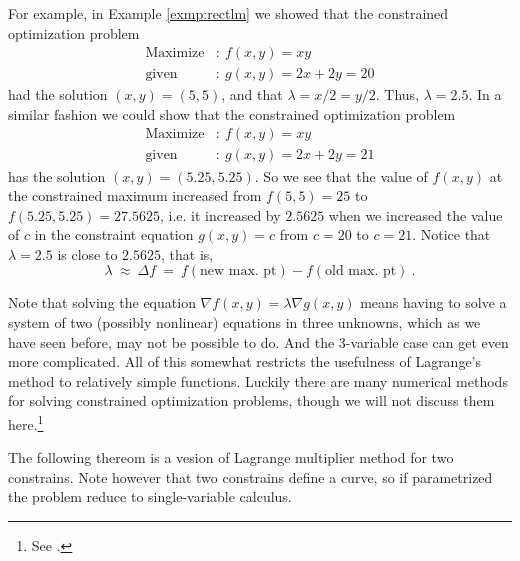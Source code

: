 For example, in Example \ref{exmp:rectlm} we showed that the constrained optimization problem
\begin{align*}
  \text{Maximize}&: ~ f(x,y) = xy\\
  \text{given}&: ~ g(x,y) = 2x + 2y = 20
\end{align*}
had the solution $(x,y) = (5,5)$, and that $\lambda = x/2 = y/2$. 
Thus, $\lambda = 2.5$. 
In a similar fashion we could
show that the constrained optimization problem
\begin{align*}
  \text{Maximize}&: ~ f(x,y) = xy\\
  \text{given}&: ~ g(x,y) = 2x + 2y = 21
\end{align*}
has the solution $(x,y) = (5.25,5.25)$. 
So we see that the value of $f(x,y)$ at the constrained maximum increased from
$f(5,5)=25$ to $f(5.25,5.25)=27.5625$, 
i.e. it increased by $2.5625$ when we increased the value of $c$ in the constraint equation $g(x,y)=c$ from $c=20$ to $c=21$. 
Notice that $\lambda = 2.5$ is close to $2.5625$, that is,
\begin{displaymath}
 \lambda ~\approx~ \Delta f ~=~ f(\text{new max. pt}) - f(\text{old max. pt}) ~.
\end{displaymath}


Note that
solving the equation $\nabla f(x,y) = \lambda \nabla g(x,y)$ means having to solve a system of two (possibly
nonlinear) equations in three unknowns, which as we have seen before, may not be possible to do. 
And the 3-variable case can get even more complicated. 
All of this somewhat restricts the usefulness of Lagrange's method to relatively simple functions. 
Luckily there are many numerical methods for solving constrained optimization problems, though we will not discuss them here.\footnote{See \cite{bss}.}

The following thereom is a vesion of Lagrange multiplier method for two constrains.
Note however that two constrains define a curve, 
so if parametrized the problem reduce to single-variable calculus.




